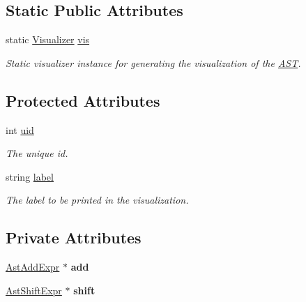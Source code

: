 \subsection*{Static Public Attributes}
\begin{DoxyCompactItemize}
\item 
\hypertarget{classAST_aca9e6637209b31e03a09c0d42f29bdfa}{static \hyperlink{classVisualizer}{Visualizer} \hyperlink{classAST_aca9e6637209b31e03a09c0d42f29bdfa}{vis}}\label{classAST_aca9e6637209b31e03a09c0d42f29bdfa}

\begin{DoxyCompactList}\small\item\em Static visualizer instance for generating the visualization of the \hyperlink{classAST}{A\-S\-T}. \end{DoxyCompactList}\end{DoxyCompactItemize}
\subsection*{Protected Attributes}
\begin{DoxyCompactItemize}
\item 
\hypertarget{classAST_a847b778f1c3dd5a19de32de432ee6e15}{int \hyperlink{classAST_a847b778f1c3dd5a19de32de432ee6e15}{uid}}\label{classAST_a847b778f1c3dd5a19de32de432ee6e15}

\begin{DoxyCompactList}\small\item\em The unique id. \end{DoxyCompactList}\item 
\hypertarget{classAST_ab2e239ccc0688d2341724432ff5a1a31}{string \hyperlink{classAST_ab2e239ccc0688d2341724432ff5a1a31}{label}}\label{classAST_ab2e239ccc0688d2341724432ff5a1a31}

\begin{DoxyCompactList}\small\item\em The label to be printed in the visualization. \end{DoxyCompactList}\end{DoxyCompactItemize}
\subsection*{Private Attributes}
\begin{DoxyCompactItemize}
\item 
\hypertarget{classAstShiftExpr_ab7f53d7e78fc19e580097130d2298aa2}{\hyperlink{classAstAddExpr}{Ast\-Add\-Expr} $\ast$ {\bfseries add}}\label{classAstShiftExpr_ab7f53d7e78fc19e580097130d2298aa2}

\item 
\hypertarget{classAstShiftExpr_a8609437ab341b8c26e2aa138d3cae348}{\hyperlink{classAstShiftExpr}{Ast\-Shift\-Expr} $\ast$ {\bfseries shift}}\label{classAstShiftExpr_a8609437ab341b8c26e2aa138d3cae348}

\end{DoxyCompactItemize}


